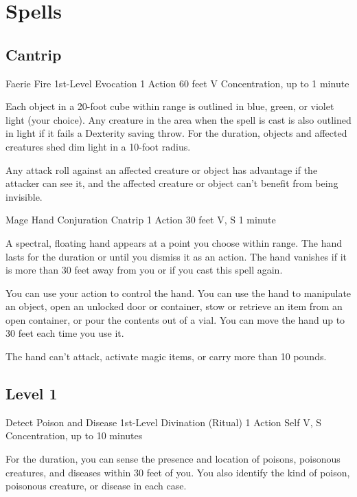 \documentclass[letterpaper,openany,oneside,twocolumn]{book}
\begin{document}
\section*{Spells}
\subsection*{Cantrip}

\DndSpellHeader
  {Faerie Fire}
  {1st-Level Evocation}
  {1 Action}
  {60 feet}
  {V}
  {Concentration, up to 1 minute}

Each object in a 20-foot cube within range is outlined in blue, green, or violet light (your choice). Any creature in the area when the spell is cast is also outlined in light if it fails a Dexterity saving throw. For the duration, objects and affected creatures shed dim light in a 10-foot radius.

Any attack roll against an affected creature or object has advantage if the attacker can see it, and the affected creature or object can't benefit from being invisible.

\DndSpellHeader
  {Mage Hand}
  {Conjuration Cnatrip}
  {1 Action}
  {30 feet}
  {V, S}
  {1 minute}

A spectral, floating hand appears at a point you choose within range. The hand lasts for the duration or until you dismiss it as an action. The hand vanishes if it is more than 30 feet away from you or if you cast this spell again.

You can use your action to control the hand. You can use the hand to manipulate an object, open an unlocked door or container, stow or retrieve an item from an open container, or pour the contents out of a vial. You can move the hand up to 30 feet each time you use it.

The hand can't attack, activate magic items, or carry more than 10 pounds.

\subsection*{Level 1}

\DndSpellHeader
  {Detect Poison and Disease}
  {1st-Level Divination (Ritual)}
  {1 Action}
  {Self}
  {V, S}
  {Concentration, up to 10 minutes}

For the duration, you can sense the presence and location of poisons, poisonous creatures, and diseases within 30 feet of you. You also identify the kind of poison, poisonous creature, or disease in each case.
\end{document}

